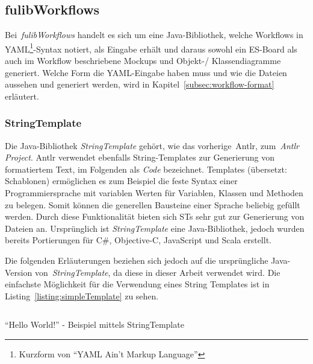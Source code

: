 \subsection{fulibWorkflows}\label{subsec:fulibworkflows}
Bei~\textit{fulibWorkflows} handelt es sich um eine Java-Bibliothek, welche Workflows in YAML\footnote{Kurzform von ``YAML Ain't Markup Language''}-Syntax notiert,
als Eingabe erhält und daraus
sowohl ein \ac{ES}-Board als auch im Workflow beschriebene Mockups und Objekt-/ Klassendiagramme generiert.
Welche Form die YAML-Eingabe haben muss und wie die Dateien aussehen und generiert werden, wird in Kapitel~\ref{subsec:workflow-format} erläutert.



\subsubsection{StringTemplate}
Die Java-Bibliothek \textit{StringTemplate} gehört, wie das vorherige~\ac{Antlr}, zum~\textit{Antlr Project}.
\ac{Antlr} verwendet ebenfalls String-Templates zur Generierung von formatiertem Text, im Folgenden als \textit{Code} bezeichnet.
Templates (übersetzt: Schablonen) ermöglichen es zum Beispiel die feste Syntax einer Programmiersprache mit variablen Werten für
Variablen, Klassen und Methoden zu belegen.
Somit können die generellen Bausteine einer Sprache beliebig gefüllt werden.
Durch diese Funktionalität bieten sich \ac{ST}s sehr gut zur Generierung von Dateien an.
Ursprünglich ist \textit{StringTemplate} eine Java-Bibliothek, jedoch wurden bereits Portierungen für C\#, Objective-C, JavaScript und Scala erstellt.

Die folgenden Erläuterungen beziehen sich jedoch auf die ursprüngliche Java-Version von~\textit{StringTemplate}, da diese in dieser Arbeit verwendet wird.
Die einfachste Möglichkeit für die Verwendung eines String Templates ist in Listing~\ref{listing:simpleTemplate} zu sehen.

\begin{listing}[!ht]
    \inputminted{java}{listings/2.2.1/JavaStringTemplateExample.java}
    \caption{``Hello World!'' - Beispiel mittels StringTemplate}
    \label{listing:simpleTemplate}
\end{listing}

